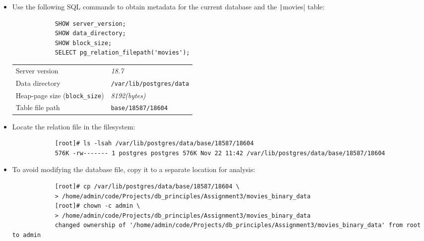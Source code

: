 \documentclass[10pt,a4paper]{article}
\begin{document}
\begin{itemize}
    \item Use the following SQL commands to obtain metadata for the current
          database and the \texttt|movies| table:
          \begin{verbatim}
            SHOW server_version;
            SHOW data_directory;
            SHOW block_size;
            SELECT pg_relation_filepath('movies');
          \end{verbatim}
          \begin{table}[h]
              \centering
              \small
              \begin{tabular}{@{}ll@{}}
                  \toprule
                  Server version                        & \textit{18.7}                                             \\
                  Data directory                        & \texttt{/var/lib/postgres/data}                 \\
                  Heap-page size (\texttt{block\_size}) & \textit{\hypertarget{page_size_link_target}{8192(bytes)}} \\
                  Table file path                       & \texttt{base/18587/18604}                       \\
                  \bottomrule
              \end{tabular}
          \end{table}
    \item Locate the relation file in the filesystem:
          \begin{verbatim}
            [root]# ls -lsah /var/lib/postgres/data/base/18587/18604
            576K -rw------- 1 postgres postgres 576K Nov 22 11:42 /var/lib/postgres/data/base/18587/18604
          \end{verbatim}

    \item To avoid modifying the database file, copy it to a separate location
          for analysis:
          \begin{verbatim}
            [root]# cp /var/lib/postgres/data/base/18587/18604 \
            > /home/admin/code/Projects/db_principles/Assignment3/movies_binary_data
            [root]# chown -c admin \
            > /home/admin/code/Projects/db_principles/Assignment3/movies_binary_data
            changed ownership of '/home/admin/code/Projects/db_principles/Assignment3/movies_binary_data' from root to admin
          \end{verbatim}
\end{itemize}
\end{document}
